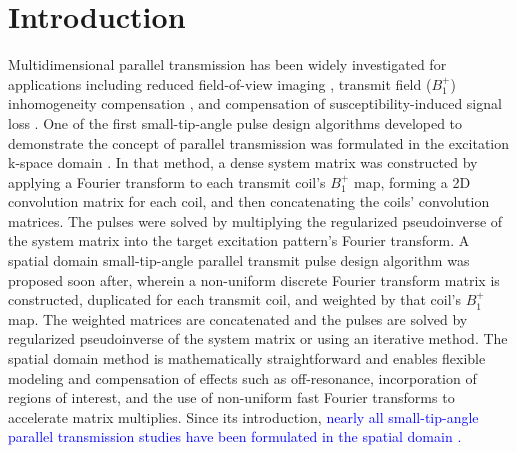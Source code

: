 \section* {Introduction}

\par Multidimensional parallel transmission \cite{Katscher:2003:Magn-Reson-Med:12509830,zhu2004parallel} has been widely investigated for applications including
reduced field-of-view imaging \cite{malik:mrm:2015,mooiweer:2016},
transmit field ($B_1^+$) inhomogeneity compensation \cite{Zhang:2007:Magn-Reson-Med:16526012,cloos:kpstd:2012},
and compensation of susceptibility-induced signal loss \cite{deng:2009}.
One of the first small-tip-angle pulse design algorithms developed to demonstrate the concept of parallel transmission was formulated in the 
excitation k-space domain \cite{Katscher:2003:Magn-Reson-Med:12509830}.
In that method, a dense system matrix was constructed by applying a Fourier transform to each transmit coil's $B_1^+$ map,
forming a 2D convolution matrix for each coil, and then concatenating the coils' convolution matrices.
The pulses were solved by multiplying the 
regularized pseudoinverse of the system matrix into the target excitation pattern's Fourier transform. 
A spatial domain small-tip-angle parallel transmit pulse design algorithm 
\cite{Grissom:2006:MRM} was proposed soon after,
wherein a non-uniform discrete Fourier transform matrix is constructed, 
duplicated for each transmit coil, and weighted by that coil's $B_1^+$ map.
The weighted matrices are concatenated and the pulses are solved by regularized pseudoinverse of the system matrix
or using an iterative method.
% 
The spatial domain method is mathematically straightforward 
and enables flexible modeling and compensation of effects such as off-resonance, 
incorporation of regions of interest,
and the use of non-uniform fast Fourier transforms to accelerate matrix multiplies.
Since its introduction, 
\textcolor{blue}{nearly all small-tip-angle parallel transmission studies have been formulated in the spatial domain \cite{padormo:2016,deniz:2019}.} 

